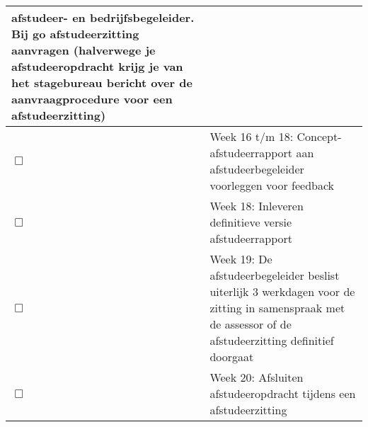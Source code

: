 \begin{center}
\begin{tabular}{ | l | p{15cm} |}
    afstudeer- en bedrijfsbegeleider. Bij go afstudeerzitting aanvragen
    (halverwege je afstudeeropdracht krijg je van het stagebureau bericht over
    de aanvraagprocedure voor een afstudeerzitting) \\ \hline
    $\Box$ & Week 16 t/m 18: Concept-afstudeerrapport aan afstudeerbegeleider
    voorleggen voor feedback \\ \hline
    $\Box$ & Week 18: Inleveren definitieve versie afstudeerrapport \\ \hline
    $\Box$ & Week 19: De afstudeerbegeleider beslist uiterlijk 3 werkdagen voor
    de zitting in samenspraak met de assessor of de afstudeerzitting definitief
    doorgaat \\ \hline
    $\Box$ & Week 20: Afsluiten afstudeeropdracht tijdens een afstudeerzitting
    \\ \hline
    \end{tabular}
\end{center}